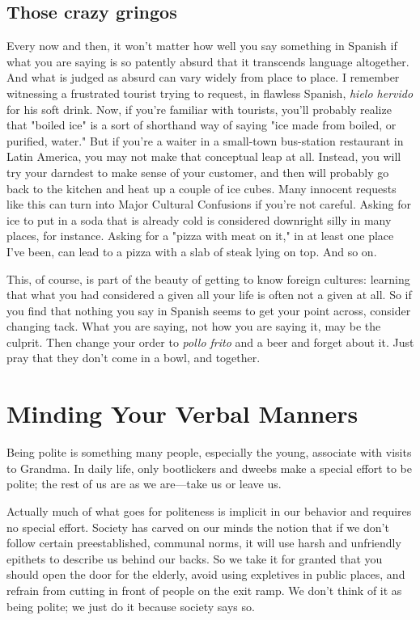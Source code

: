 \documentclass[14pt,a4paper,oneside]{memoir}
\begin{document}
\section{Those crazy gringos}

Every now and then, it won't matter how well you say something in Spanish if what you are saying is so patently absurd that it
transcends language altogether. And what is judged as absurd can vary
widely from place to place. I remember witnessing a frustrated tourist trying to request, in flawless Spanish, \emph{hielo hervido} for his soft
drink. Now, if you're familiar with tourists, you'll probably realize that
"boiled ice" is a sort of shorthand way of saying "ice made from boiled,
or purified, water." But if you're a waiter in a small-town bus-station
restaurant in Latin America, you may not make that conceptual leap at
all. Instead, you will try your darndest to make sense of your customer,
and then will probably go back to the kitchen and heat up a couple of
ice cubes. Many innocent requests like this can turn into Major Cultural Confusions if you're not careful. Asking for ice to put in a soda
that is already cold is considered downright silly in many places, for
instance. Asking for a "pizza with meat on it," in at least one place I've
been, can lead to a pizza with a slab of steak lying on top. And so on.

This, of course, is part of the beauty of getting to know foreign
cultures: learning that what you had considered a given all your life is
often not a given at all. So if you find that nothing you say in Spanish
seems to get your point across, consider changing tack. What you are
saying, not how you are saying it, may be the culprit. Then change
your order to \emph{pollo frito} and a beer and forget about it. Just pray that
they don't come in a bowl, and together.

\chapter{Minding Your Verbal Manners}

Being polite is something many people, especially the young,
associate with visits to Grandma. In daily life, only bootlickers and
dweebs make a special effort to be polite; the rest of us are as we
are---take us or leave us.

Actually much of what goes for politeness is implicit in our
behavior and requires no special effort. Society has carved on our
minds the notion that if we don't follow certain preestablished, communal norms, it will use harsh and unfriendly epithets to describe us
behind our backs. So we take it for granted that you should open the
door for the elderly, avoid using expletives in public places, and refrain
from cutting in front of people on the exit ramp. We don't think of it as
being polite; we just do it because society says so.
\end{document}
